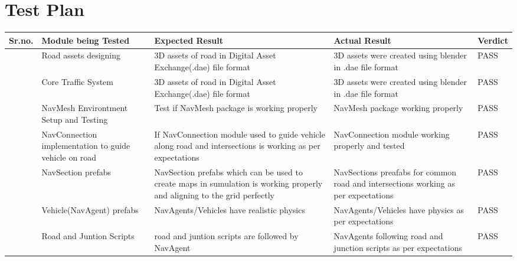 \documentclass[openany,12pt]{report}
\begin{document}
		
		\section{Test Plan}
		\begin{longtable}{|p{0.6cm}|p{3.5cm}|p{5cm}|p{3.5cm}|p{1.7cm}|} \hline		
			\textbf{Sr.\newline no.} &\textbf{Module being Tested}	&\textbf{Expected Result}	&\textbf{Actual Result}	&\textbf{Verdict} \\\hline\hline

			\addtocounter{num}{1}
			\thenum&	
			Road assets designing&
			3D assets of road in Digital Asset Exchange(.dae) file format&
			3D assets were created using blender in .dae file format&
			PASS\\\hline
			
			\addtocounter{num}{1}
			\thenum&
			Core Traffic System&
			3D assets of road in Digital Asset Exchange(.dae) file format&
			3D assets were created using blender in .dae file format&
			PASS\\\hline
			
			\addtocounter{num}{1}
			\thenum&
			NavMesh Environtment Setup and Testing&
			Test if NavMesh package is working properly&
			NavMesh package working properly&
			PASS\\\hline			
			
			\addtocounter{num}{1}
			\thenum&
			NavConnection implementation to guide vehicle on road&
			If NavConnection module used to guide vehicle along road and intersections is working as per expectations&
			NavConnection module working properly and tested&
			PASS\\\hline
			
			\addtocounter{num}{1}
			\thenum&
			NavSection prefabs&
			NavSection prefabs which can be used to create maps in sumulation is working properly and aligning to the grid perfectly&
			NavSections preafabs for common road and intersections working as per expectations&
			PASS\\\hline
			
			\addtocounter{num}{1}
			\thenum&
			Vehicle(NavAgent) prefabs&
			NavAgents/Vehicles have realistic physics&
			NavAgents/Vehicles have physics as per expectations&
			PASS\\\hline
			
			\addtocounter{num}{1}
			\thenum&
			Road and Juntion Scripts&
			road and juntion scripts are followed by NavAgent&
			NavAgents following road and junction scripts as per expectations&
			PASS\\\hline
			

\end{longtable}
\end{document}

